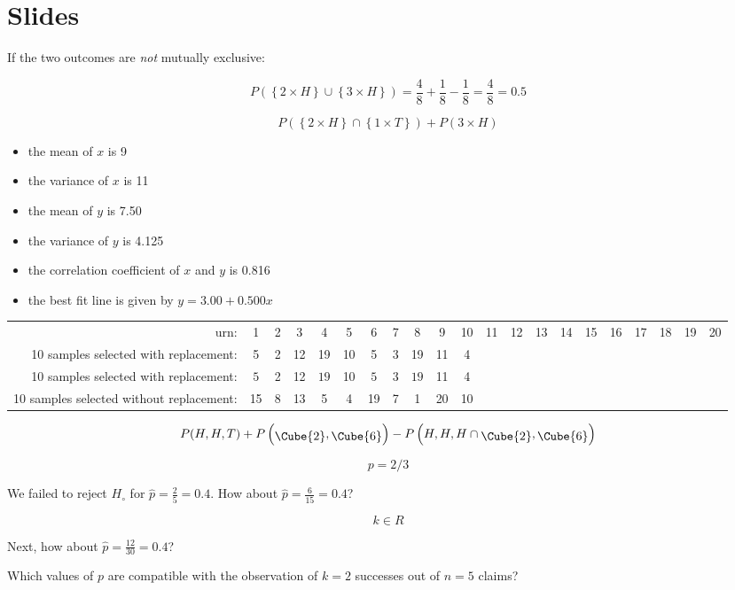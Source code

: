 \documentclass{article}
\begin{document}
\section*{Slides}

If the two outcomes are \emph{not} mutually exclusive:

\[
P\left(\left\{2\times{H}\right\} \cup \left\{3\times{H}\right\}\right)
= \frac{4}{8} + \frac{1}{8} - \frac{1}{8} = \frac{4}{8} = 0.5
\]

\[
P\left(\left\{2\times{H}\right\} \cap \left\{1\times{T}\right\}\right) +
P\left(3 \times{H}\right)
\]

\begin{itemize}
\item the mean of $x$ is 9
\item the variance of $x$ is 11
\item the mean of $y$ is 7.50
\item the variance of $y$ is 4.125
\item the correlation coefficient of $x$ and $y$ is 0.816
\item the best fit line is given by $y = 3.00 + 0.500 x$
\end{itemize}

\begin{tabular}{r|cccccccccccccccccccc}
  urn: & 1 & 2 & 3 & 4 & 5 & 6 & 7 & 8 & 9 & 10 &
  11 & 12 & 13 & 14 & 15 & 16 & 17 & 18 & 19 & 20 \\
  10 samples selected with replacement: &
  5 & 2 & 12 & 19 & 10 & 5 & 3 & 19 & 11 & 4
  & & & & & & & & & & \\
  10 samples selected with replacement: &
  $\boxed{5}$ & 2 & 12 & $\boxed{19}$ & 10 & $\boxed{5}$ & 3 & $\boxed{19}$ & 11 & 4
  & & & & & & & & & & \\
  10 samples selected without replacement: &
  15 & 8 & 13 & 5 & 4 & 19 & 7 & 1 & 20 & 10
  & & & & & & & & & & 
\end{tabular}

\[
P(H,H,T) +
P\left(\raisebox{-2pt}{\Cube{2}},\raisebox{-2pt}{\Cube{6}}\right) -
P\left(H,H,H \cap \raisebox{-2pt}{\Cube{2}},\raisebox{-2pt}{\Cube{6}}\right)
\]

\[
p = 2/3
\]

We failed to reject $H_\circ$ for $\hat{p}=\frac{2}{5}=0.4$. How about
$\hat{p}=\frac{6}{15}=0.4$?

\[
k \in R
\]

Next, how about $\hat{p}=\frac{12}{30}=0.4$?

Which values of $p$ are compatible with the observation of $k=2$
successes out of $n=5$ claims?
\end{document}
